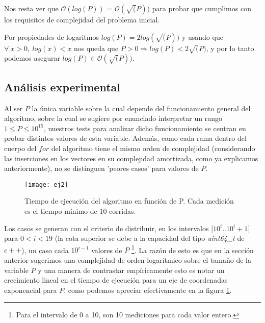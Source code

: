 	Nos resta ver que $\mathcal{O} (log(P))$ = $\mathcal{O} (\sqrt(P))$ para probar que cumplimos con los requisitos de complejidad del problema inicial.
	
	Por propiedades de logaritmos $log(P) = 2log(\sqrt(P))$ y usando que $\forall \ x > 0, \ log(x) < x$ nos queda que $ P > 0 \Longrightarrow log(P) < 2\sqrt(P)$, y por lo tanto podemos asegurar $log(P) \in \mathcal{O} (\sqrt(P))$. 

\subsection{Análisis experimental}

	Al ser $P$ la única variable sobre la cual depende del funcionamiento general del algoritmo, sobre la cual se sugiere por enunciado interpretar un rango $1 \leq P \leq 10^{15}$, nuestros tests para analizar dicho funcionamiento se centran en probar distintos valores de esta variable. Además, como cada rama dentro del cuerpo del $for$ del algoritmo tiene el mismo orden de complejidad (considerando las inserciones en los vectores en su complejidad amortizada, como ya explicamos anteriormente), no se distinguen 'peores casos' para valores de $P$.
	\\

\begin{figure}[H]
    \centering
    \texttt{[image: ej2]}
    \caption{Tiempo de ejecución del algoritmo en función de P. Cada medición es el tiempo mínimo de 10 corridas.}
    \label{fig:ej2-fig}
\end{figure}

Los casos se generan con el criterio de distribuir, en los intervalos $[10^i$..$10^i+1]$ para $0 < i < 19$ (la cota superior se debe a la capacidad del tipo \emph{uint64_t} de $c++$), un caso cada $10^{i-1}$ valores de $P$ \footnote{Para el intervalo de 0 a 10, son 10 mediciones para cada valor entero.}. La razón de esto es que en la sección anterior sugerimos una complejidad de orden logarítmico sobre el tamaño de la variable $P$ y una manera de contrastar empíricamente esto es notar un crecimiento lineal en el tiempo de ejecución para un eje de coordenadas exponencial para $P$, como podemos apreciar efectivamente en la figura \ref{fig:ej2-fig}.

